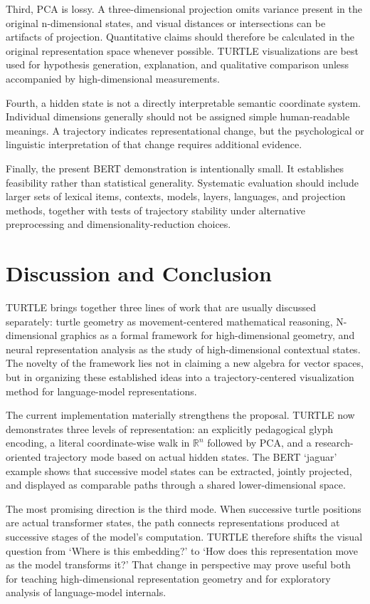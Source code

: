 \documentclass[manuscript,screen,nonacm]{acmart}
\begin{document}
Third, PCA is lossy. A three-dimensional projection omits variance present in the original n-dimensional states, and visual distances or intersections can be artifacts of projection. Quantitative claims should therefore be calculated in the original representation space whenever possible. TURTLE visualizations are best used for hypothesis generation, explanation, and qualitative comparison unless accompanied by high-dimensional measurements.

Fourth, a hidden state is not a directly interpretable semantic coordinate system. Individual dimensions generally should not be assigned simple human-readable meanings. A trajectory indicates representational change, but the psychological or linguistic interpretation of that change requires additional evidence.

Finally, the present BERT demonstration is intentionally small. It establishes feasibility rather than statistical generality. Systematic evaluation should include larger sets of lexical items, contexts, models, layers, languages, and projection methods, together with tests of trajectory stability under alternative preprocessing and dimensionality-reduction choices.

\section{Discussion and Conclusion}\label{discussion-and-conclusion}

TURTLE brings together three lines of work that are usually discussed separately: turtle geometry as movement-centered mathematical reasoning, N-dimensional graphics as a formal framework for high-dimensional geometry, and neural representation analysis as the study of high-dimensional contextual states. The novelty of the framework lies not in claiming a new algebra for vector spaces, but in organizing these established ideas into a trajectory-centered visualization method for language-model representations.

The current implementation materially strengthens the proposal. TURTLE now demonstrates three levels of representation: an explicitly pedagogical glyph encoding, a literal coordinate-wise walk in \(\mathbb{R}^n\) followed by PCA, and a research-oriented trajectory mode based on actual hidden states. The BERT `jaguar' example shows that successive model states can be extracted, jointly projected, and displayed as comparable paths through a shared lower-dimensional space.

The most promising direction is the third mode. When successive turtle positions are actual transformer states, the path connects representations produced at successive stages of the model's computation. TURTLE therefore shifts the visual question from `Where is this embedding?' to `How does this representation move as the model transforms it?' That change in perspective may prove useful both for teaching high-dimensional representation geometry and for exploratory analysis of language-model internals.
\end{document}
